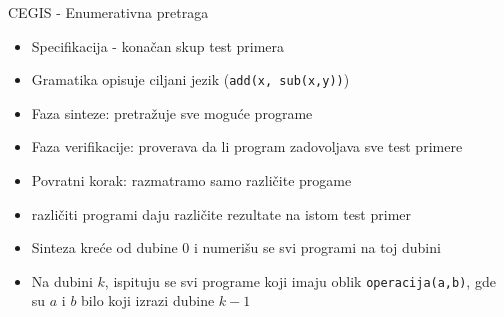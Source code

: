 \begin{frame}{CEGIS - Enumerativna pretraga}
    \begin{itemize}
        \item Specifikacija - konačan skup test primera
        \item Gramatika opisuje ciljani jezik (\texttt{add(x, sub(x,y))})
        \item Faza sinteze: pretražuje sve moguće programe
        \item Faza verifikacije: proverava da li program zadovoljava sve test primere
        \item Povratni korak: razmatramo samo različite progame
        \item različiti programi daju različite rezultate na istom test primer
        \item Sinteza kreće od dubine $0$ i numerišu se svi programi na toj dubini
        \item Na dubini $k$, ispituju se svi programe koji imaju oblik \texttt{operacija(a,b)}, gde su $a$ i $b$ bilo koji izrazi dubine $k-1$
    \end{itemize}
\end{frame}
